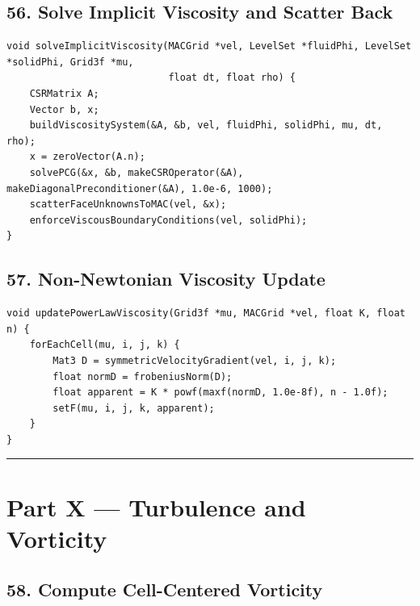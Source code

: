 \documentclass[10pt,letterpaper]{article}
\begin{document}
\subsection*{56. Solve Implicit Viscosity and Scatter Back}

\begin{verbatim}
void solveImplicitViscosity(MACGrid *vel, LevelSet *fluidPhi, LevelSet *solidPhi, Grid3f *mu,
                            float dt, float rho) {
    CSRMatrix A;
    Vector b, x;
    buildViscositySystem(&A, &b, vel, fluidPhi, solidPhi, mu, dt, rho);
    x = zeroVector(A.n);
    solvePCG(&x, &b, makeCSROperator(&A), makeDiagonalPreconditioner(&A), 1.0e-6, 1000);
    scatterFaceUnknownsToMAC(vel, &x);
    enforceViscousBoundaryConditions(vel, solidPhi);
}
\end{verbatim}

\subsection*{57. Non-Newtonian Viscosity Update}

\begin{verbatim}
void updatePowerLawViscosity(Grid3f *mu, MACGrid *vel, float K, float n) {
    forEachCell(mu, i, j, k) {
        Mat3 D = symmetricVelocityGradient(vel, i, j, k);
        float normD = frobeniusNorm(D);
        float apparent = K * powf(maxf(normD, 1.0e-8f), n - 1.0f);
        setF(mu, i, j, k, apparent);
    }
}
\end{verbatim}

\medskip\hrule\medskip

\clearpage
{}
\section*{Part X --- Turbulence and Vorticity}

\subsection*{58. Compute Cell-Centered Vorticity}
\end{document}
